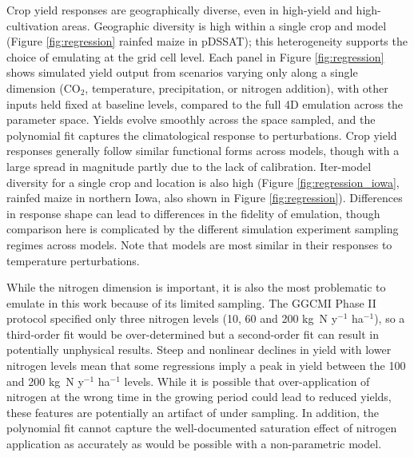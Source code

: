 \documentclass[gmd, manuscript]{copernicus} %
\begin{document}
Crop yield responses are geographically diverse, even in high-yield and high-cultivation areas. Geographic diversity is high  within a single crop and model (Figure \ref{fig:regression} rainfed maize in pDSSAT); this heterogeneity supports the choice of emulating at the grid cell level. Each panel in Figure \ref{fig:regression} shows simulated yield output from scenarios varying only along a single dimension (CO$_2$, temperature, precipitation, or nitrogen addition), with other inputs held fixed at baseline levels, compared to the full 4D emulation across the parameter space. Yields evolve smoothly across the space sampled, and the polynomial fit captures the climatological response to perturbations. Crop yield responses generally follow similar functional forms across models, though with a large spread in magnitude partly due to the lack of calibration. Iter-model diversity for a single crop and location is also high (Figure \ref{fig:regression_iowa}, rainfed maize in northern Iowa, also shown in Figure \ref{fig:regression}). Differences in response shape can lead to  differences in the fidelity of emulation, though comparison here is complicated by the different simulation experiment sampling regimes across models. Note that models are most similar in their responses to temperature perturbations. 

While the nitrogen dimension is important, it is also the most problematic to emulate in this work because of its limited sampling. The GGCMI Phase II protocol specified only three nitrogen levels (10, 60 and 200 kg~N y$^{-1}$ ha$^{-1}$), so a third-order fit would be over-determined but a second-order fit can result in potentially unphysical results. Steep and nonlinear declines in yield with lower nitrogen levels mean that some regressions imply a peak in yield between the 100 and 200 kg~N y$^{-1}$ ha$^{-1}$ levels. While it is possible that over-application of nitrogen at the wrong time in the growing period could lead to reduced yields, these features are potentially an artifact of under sampling. In addition, the polynomial fit cannot capture the well-documented saturation effect of nitrogen application \citep[e.g.][]{Torsten77} as accurately as would be possible with a non-parametric model. 
\end{document}
